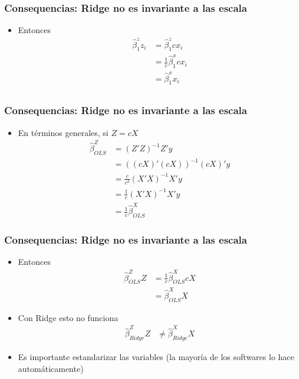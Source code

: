 \documentclass[
  shownotes,
  xcolor={svgnames},
  hyperref={colorlinks,citecolor=DarkBlue,linkcolor=andesred,urlcolor=DarkBlue}
  , aspectratio=169]{beamer}
\begin{document}
\begin{frame}[fragile]
\frametitle{Consequencias: Ridge no es invariante a las escala}
\begin{itemize}
  \item Entonces
  \begin{align}
  \hat{\beta}^z_{1}z_i &=\hat{\beta}^z_{1}cx_i \\
  &=\frac{1}{c}\hat{\beta}^x_1cx_i \\
  &=\hat{\beta}^x_1 x_i \\
  \end{align}
  
  
\end{itemize}
\end{frame}
\begin{frame}[fragile]
\frametitle{Consequencias: Ridge no es invariante a las escala}
\begin{itemize}
  
  \item En términos generales, si $Z=cX$
  \begin{align*}
    \hat{\beta}^Z_{OLS}  &= (Z'Z)^{-1} Z' y \\
                         &= ((cX)'(cX))^{-1} (cX)' y \\
                         &= \frac{c}{c^2}(X'X)^{-1} X' y \\
                         &= \frac{1}{c}(X'X)^{-1} X' y  \\
                         &= \frac{1}{c} \hat{\beta}^X_{OLS}
  \end{align*} 
\end{itemize}

  \end{frame}
\begin{frame}[fragile]
\frametitle{Consequencias: Ridge no es invariante a las escala}
\begin{itemize}
  \item Entonces
  \begin{align*}
  \hat{\beta}^Z_{OLS} Z  &=  \frac{1}{c} \hat{\beta}^X_{OLS} cX \\
                         &= \hat{\beta}^X_{OLS} X
  \end{align*} 
\medskip
  \item Con Ridge esto no funciona
    \begin{align*}
  \hat{\beta}^Z_{Ridge} Z &\neq  \hat{\beta}^X_{Ridge} X
  \end{align*} 

\item Es importante estandarizar las variables (la mayoría de los softwares lo hace automáticamente)
\end{itemize}


\end{frame}
\end{document}
